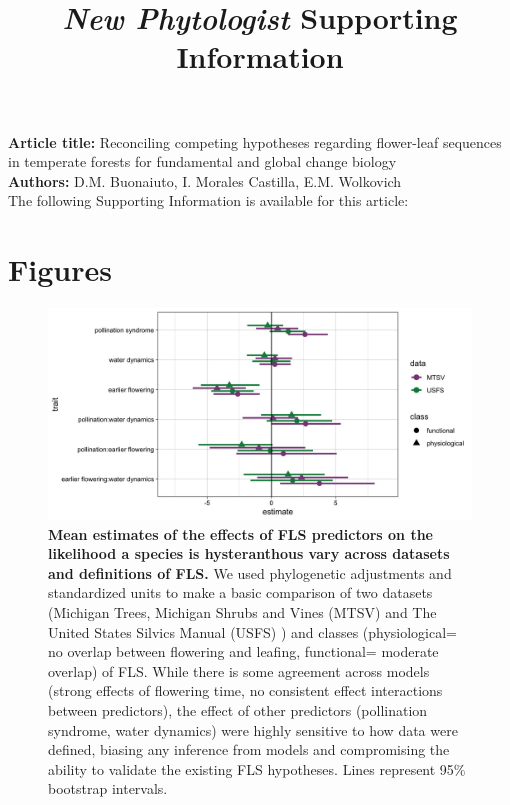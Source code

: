 \documentclass[12pt]{article}\usepackage[]{graphicx}\usepackage[]{color}
\title{\textit{New Phytologist} Supporting Information}
\date{}
\begin{document}
\maketitle

\noindent \textbf{Article title:} Reconciling competing hypotheses regarding flower-leaf sequences in temperate forests for fundamental and global change biology\\
\noindent \textbf{Authors:} D.M. Buonaiuto, I. Morales Castilla, E.M. Wolkovich\\

\noindent The following Supporting Information is available for this article:\\


\section*{Figures}

\begin{figure}[H]
    \centering
 \includegraphics[width=\textwidth]{..//MTSV_USFS.jpeg} 
    \caption{\textbf{Mean estimates of the effects of FLS predictors on the likelihood a species is hysteranthous vary across datasets and definitions of FLS.}  We used phylogenetic adjustments and standardized units to make a basic comparison of two datasets (Michigan Trees, Michigan Shrubs and Vines (MTSV) \citep{Barnes2004,Barnes2016} and The United States Silvics Manual (USFS) \citep{Burns1990}) and classes (physiological= no overlap between flowering and leafing, functional= moderate overlap) of FLS. While there is some agreement across models (strong effects of flowering time, no consistent effect interactions between predictors), the effect of other predictors (pollination syndrome, water dynamics) were highly sensitive to how data were defined, biasing any inference from models and compromising the ability to validate the existing FLS hypotheses. Lines represent 95\% bootstrap intervals.}
    \label{fig:muplots.USMT}
\end{figure}
\end{document}
